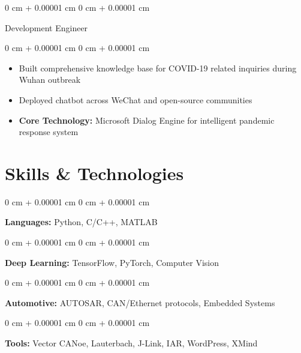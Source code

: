 \documentclass[10pt, a4paper]{article}
\newenvironment{highlights}{
    \begin{itemize}[
        topsep=0.15 cm,
        parsep=0.08 cm,
        partopsep=0pt,
        itemsep=0.05 cm,
        leftmargin=0 cm + 10pt
    ]
}{
    \end{itemize}
} %
\newenvironment{onecolentry}{
    \begin{adjustwidth}{
        0 cm + 0.00001 cm
    }{
        0 cm + 0.00001 cm
    }
}{
    \end{adjustwidth}
} %
\newenvironment{twocolentry}[2][]{
    \onecolentry
    \def\secondColumn{#2}
    \setcolumnwidth{\fill, 4.5 cm}
    \begin{paracol}{2}
}{
    \switchcolumn \raggedleft \secondColumn
    \end{paracol}
    \endonecolentry
} %
\begin{document}
        \begin{twocolentry}{
            
        }
            Development Engineer\end{twocolentry}

        \vspace{0.10 cm}
        \begin{onecolentry}
            \begin{highlights}
                \item Built comprehensive knowledge base for COVID-19 related inquiries during Wuhan outbreak
                \item Deployed chatbot across WeChat and open-source communities
                \item \textbf{Core Technology:} Microsoft Dialog Engine for intelligent pandemic response system
            \end{highlights}
        \end{onecolentry}



    
    \section{Skills \& Technologies}

        \begin{onecolentry}
            \textbf{Languages:} Python, C/C++, MATLAB
        \end{onecolentry}

        \vspace{0.2 cm}

        \begin{onecolentry}
            \textbf{Deep Learning:} TensorFlow, PyTorch, Computer Vision
        \end{onecolentry}

        \vspace{0.2 cm}

        \begin{onecolentry}
            \textbf{Automotive:} AUTOSAR, CAN/Ethernet protocols, Embedded Systems
        \end{onecolentry}

        \vspace{0.2 cm}

        \begin{onecolentry}
            \textbf{Tools:} Vector CANoe, Lauterbach, J-Link, IAR, WordPress, XMind
        \end{onecolentry}
\end{document}
